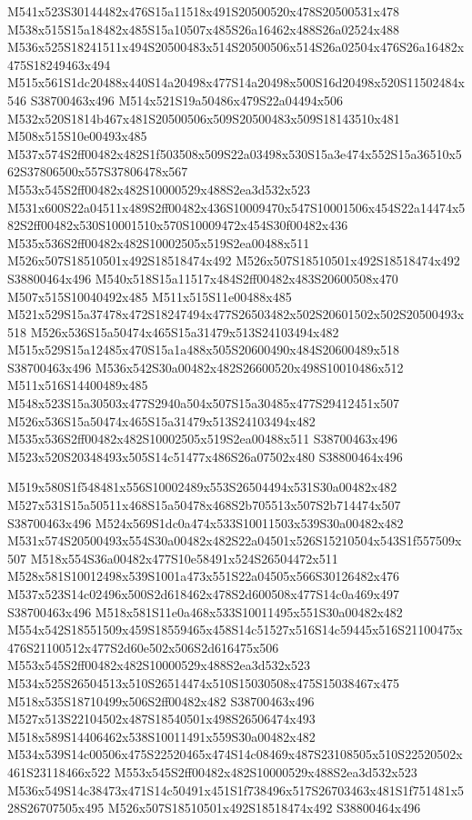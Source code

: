 \documentclass{article}
\begin{document}
\begin{multicols}{2}
M541x523S30144482x476S15a11518x491S20500520x478S20500531x478 M538x515S15a18482x485S15a10507x485S26a16462x488S26a02524x488 M536x525S18241511x494S20500483x514S20500506x514S26a02504x476S26a16482x475S18249463x494 M515x561S1dc20488x440S14a20498x477S14a20498x500S16d20498x520S11502484x546 S38700463x496 M514x521S19a50486x479S22a04494x506 M532x520S1814b467x481S20500506x509S20500483x509S18143510x481 M508x515S10e00493x485 M537x574S2ff00482x482S1f503508x509S22a03498x530S15a3e474x552S15a36510x562S37806500x557S37806478x567 M553x545S2ff00482x482S10000529x488S2ea3d532x523 M531x600S22a04511x489S2ff00482x436S10009470x547S10001506x454S22a14474x582S2ff00482x530S10001510x570S10009472x454S30f00482x436 M535x536S2ff00482x482S10002505x519S2ea00488x511 M526x507S18510501x492S18518474x492 M526x507S18510501x492S18518474x492 S38800464x496 M540x518S15a11517x484S2ff00482x483S20600508x470 M507x515S10040492x485 M511x515S11e00488x485 M521x529S15a37478x472S18247494x477S26503482x502S20601502x502S20500493x518 M526x536S15a50474x465S15a31479x513S24103494x482 M515x529S15a12485x470S15a1a488x505S20600490x484S20600489x518 S38700463x496 M536x542S30a00482x482S26600520x498S10010486x512 M511x516S14400489x485 M548x523S15a30503x477S2940a504x507S15a30485x477S29412451x507 M526x536S15a50474x465S15a31479x513S24103494x482 M535x536S2ff00482x482S10002505x519S2ea00488x511 S38700463x496 M523x520S20348493x505S14c51477x486S26a07502x480 S38800464x496

M519x580S1f548481x556S10002489x553S26504494x531S30a00482x482 M527x531S15a50511x468S15a50478x468S2b705513x507S2b714474x507 S38700463x496 M524x569S1dc0a474x533S10011503x539S30a00482x482 M531x574S20500493x554S30a00482x482S22a04501x526S15210504x543S1f557509x507 M518x554S36a00482x477S10e58491x524S26504472x511 M528x581S10012498x539S1001a473x551S22a04505x566S30126482x476 M537x523S14c02496x500S2d618462x478S2d600508x477S14c0a469x497 S38700463x496 M518x581S11e0a468x533S10011495x551S30a00482x482 M554x542S18551509x459S18559465x458S14c51527x516S14c59445x516S21100475x476S21100512x477S2d60e502x506S2d616475x506 M553x545S2ff00482x482S10000529x488S2ea3d532x523 M534x525S26504513x510S26514474x510S15030508x475S15038467x475 M518x535S18710499x506S2ff00482x482 S38700463x496 M527x513S22104502x487S18540501x498S26506474x493 M518x589S14406462x538S10011491x559S30a00482x482 M534x539S14c00506x475S22520465x474S14c08469x487S23108505x510S22520502x461S23118466x522 M553x545S2ff00482x482S10000529x488S2ea3d532x523 M536x549S14c38473x471S14c50491x451S1f738496x517S26703463x481S1f751481x528S26707505x495 M526x507S18510501x492S18518474x492 S38800464x496


\end{multicols}
\end{document}
